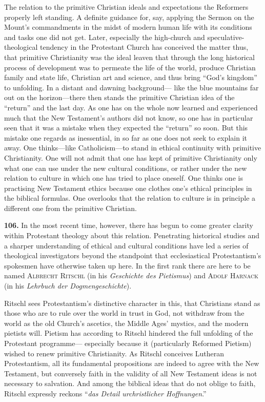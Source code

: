 \documentclass[12pt,a4paper]{book}
\newcommand{\opage}[1]{\marginnote{\footnotesize\textit{[#1]}}}
\begin{document}
The relation to the primitive Christian ideals and expectations the Reformers properly left standing. A definite
guidance for, say, applying the Sermon on the Mount's commandments in the midst of modern human life with its
conditions and tasks one did not get. Later, especially the high-church and speculative-theological tendency in the
Protestant Church has conceived the matter thus, that primitive Christianity was the ideal leaven that through the
long historical process of development was to permeate the life of the world, produce Christian family and state
life, Christian art and science, and thus bring ``God's kingdom'' to unfolding. In a distant and dawning background---
like the blue mountains far out on the horizon---there then stands the primitive Christian idea of the ``return'' and
the last day. As one has on the whole now learned and experienced much that the New Testament's authors did not know,
so one has in particular seen that it was a mistake when they expected the ``return'' so soon. But this mistake one
regards as inessential, in so far as one does not seek to explain it away. One thinks---like Catholicism---to stand in
ethical continuity with primitive Christianity. One will not admit that one has kept of primitive Christianity only
what one can use under the new cultural conditions, or rather under the new relation to culture in which one has tried
to place oneself. One thinks one is practising New Testament ethics because one clothes one's ethical principles in
the biblical formulas. One overlooks that the relation to culture is in principle a different one from the primitive
Christian.

\medskip

\noindent\textbf{106.} In the most recent time, however, there has begun to come greater clarity within Protestant
theology about this relation. Penetrating historical studies and a sharper understanding of ethical and cultural
conditions have led a series of theological investigators beyond the standpoint that ecclesiastical Protestantism's
spokesmen have otherwise taken up here. In the first rank there are here to be named \textsc{Albrecht Ritschl} (in his
\emph{Geschichte des Pietismus}) and \textsc{Adolf Harnack} (in his \emph{Lehrbuch der Dogmengeschichte}).

Ritschl sees Protestantism's distinctive character in this, that Christians stand as those who are to rule over the
world in trust in God, not withdraw from the world as the old Church's ascetics, the Middle Ages' mystics, and the
modern 
\opage{235}pietists will. Pietism has according to Ritschl hindered the full unfolding of the Protestant programme---%
especially because it (particularly Reformed Pietism) wished to renew primitive Christianity. As Ritschl conceives
Lutheran Protestantism, all its fundamental propositions are indeed to agree with the New Testament, but conversely
faith in the validity of all New Testament ideas is not necessary to salvation. And among the biblical ideas that do
not oblige to faith, Ritschl expressly reckons ``\textit{das Detail urchristlicher Hoffnungen}.''
\end{document}
